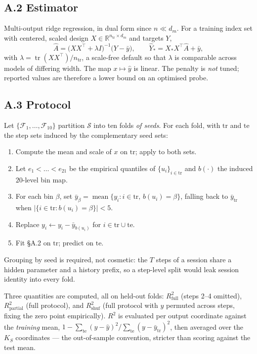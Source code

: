 \subsection{A.2 Estimator}

Multi-output ridge regression, in dual form since $n\ll d_m$. For a training
index set with centered, scaled design $X\in\mathbb{R}^{n_{\mathrm{tr}}\times d_m}$
and targets $Y$,
\[
\hat A=\bigl(XX^{\!\top}+\lambda I\bigr)^{-1}\!\bigl(Y-\bar y\bigr),
\qquad
\hat Y_{\ast}=X_{\ast}X^{\!\top}\hat A+\bar y ,
\]
with $\lambda=\operatorname{tr}(XX^{\!\top})/n_{\mathrm{tr}}$, a scale-free
default so that $\lambda$ is comparable across models of differing width. The
map $x\mapsto\hat y$ is linear. The penalty is \emph{not} tuned; reported
values are therefore a lower bound on an optimised probe.

\subsection{A.3 Protocol}

Let $\{\mathcal{F}_1,\dots,\mathcal{F}_{10}\}$ partition $\mathcal{S}$ into ten
folds \emph{of seeds}. For each fold, with $\mathrm{tr}$ and $\mathrm{te}$ the
step sets induced by the complementary seed sets:

\begin{enumerate}\itemsep2pt
\item Compute the mean and scale of $x$ on $\mathrm{tr}$; apply to both sets.
\item Let $e_1<\dots<e_{21}$ be the empirical quantiles of $\{u_i\}_{i\in\mathrm{tr}}$
      and $b(\cdot)$ the induced $20$-level bin map.
\item For each bin $\beta$, set $\bar y_\beta=\operatorname{mean}\{y_i : i\in\mathrm{tr},\,
      b(u_i)=\beta\}$, falling back to $\bar y_{\mathrm{tr}}$ when
      $|\{i\in\mathrm{tr}: b(u_i)=\beta\}|<5$.
\item Replace $y_i \leftarrow y_i-\bar y_{b(u_i)}$ for $i\in\mathrm{tr}\cup\mathrm{te}$.
\item Fit \S A.2 on $\mathrm{tr}$; predict on $\mathrm{te}$.
\end{enumerate}

Grouping by seed is required, not cosmetic: the $T$ steps of a session share a
hidden parameter and a history prefix, so a step-level split would leak session
identity into every fold.

Three quantities are computed, all on held-out folds: $R^2_{\mathrm{full}}$
(steps 2--4 omitted), $R^2_{\mathrm{partial}}$ (full protocol), and
$R^2_{\mathrm{shuf}}$ (full protocol with $y$ permuted across steps, fixing the
zero point empirically). $R^2$ is evaluated per output coordinate against the
\emph{training} mean,
$1-\sum_{\mathrm{te}}(y-\hat y)^2/\sum_{\mathrm{te}}(y-\bar y_{\mathrm{tr}})^2$,
then averaged over the $K_S$ coordinates --- the out-of-sample convention,
stricter than scoring against the test mean.

